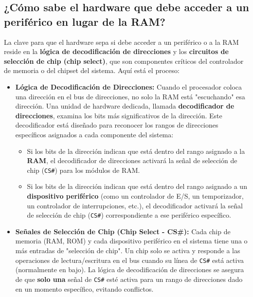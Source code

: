 \documentclass[12pt, a4paper]{article}
\begin{document}
\subsection*{¿Cómo sabe el hardware que debe acceder a un periférico en lugar de la RAM?}
La clave para que el hardware sepa si debe acceder a un periférico o a la RAM reside en la \textbf{lógica de decodificación de direcciones} y los \textbf{circuitos de selección de chip (chip select)}, que son componentes críticos del controlador de memoria o del chipset del sistema. Aquí está el proceso:
\begin{itemize}
    \item \textbf{Lógica de Decodificación de Direcciones:} Cuando el procesador coloca una dirección en el bus de direcciones, no solo la RAM está "escuchando" esa dirección. Una unidad de hardware dedicada, llamada \textbf{decodificador de direcciones}, examina los bits más significativos de la dirección. Este decodificador está diseñado para reconocer los rangos de direcciones específicos asignados a cada componente del sistema:
    \begin{itemize}
        \item Si los bits de la dirección indican que está dentro del rango asignado a la \textbf{RAM}, el decodificador de direcciones activará la señal de selección de chip (\texttt{CS\#}) para los módulos de RAM.
        \item Si los bits de la dirección indican que está dentro del rango asignado a un \textbf{dispositivo periférico} (como un controlador de E/S, un temporizador, un controlador de interrupciones, etc.), el decodificador activará la señal de selección de chip (\texttt{CS\#}) correspondiente a ese periférico específico.
    \end{itemize}
    \item \textbf{Señales de Selección de Chip (Chip Select - CS\#):} Cada chip de memoria (RAM, ROM) y cada dispositivo periférico en el sistema tiene una o más entradas de "selección de chip". Un chip solo se activa y responde a las operaciones de lectura/escritura en el bus cuando su línea de \texttt{CS\#} está activa (normalmente en bajo). La lógica de decodificación de direcciones se asegura de que \textbf{solo una} señal de \texttt{CS\#} esté activa para un rango de direcciones dado en un momento específico, evitando conflictos.
\end{itemize}
\end{document}
